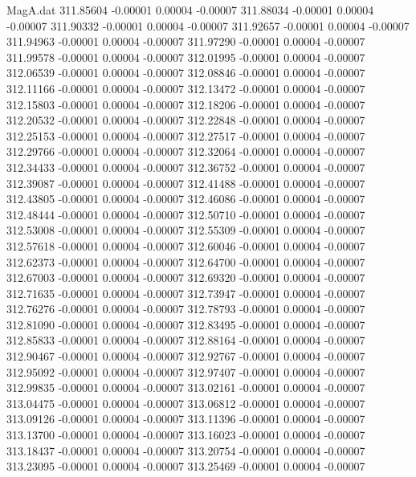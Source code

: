 \begin{filecontents}{MagA.dat}
 311.85604   -0.00001    0.00004   -0.00007
 311.88034   -0.00001    0.00004   -0.00007
 311.90332   -0.00001    0.00004   -0.00007
 311.92657   -0.00001    0.00004   -0.00007
 311.94963   -0.00001    0.00004   -0.00007
 311.97290   -0.00001    0.00004   -0.00007
 311.99578   -0.00001    0.00004   -0.00007
 312.01995   -0.00001    0.00004   -0.00007
 312.06539   -0.00001    0.00004   -0.00007
 312.08846   -0.00001    0.00004   -0.00007
 312.11166   -0.00001    0.00004   -0.00007
 312.13472   -0.00001    0.00004   -0.00007
 312.15803   -0.00001    0.00004   -0.00007
 312.18206   -0.00001    0.00004   -0.00007
 312.20532   -0.00001    0.00004   -0.00007
 312.22848   -0.00001    0.00004   -0.00007
 312.25153   -0.00001    0.00004   -0.00007
 312.27517   -0.00001    0.00004   -0.00007
 312.29766   -0.00001    0.00004   -0.00007
 312.32064   -0.00001    0.00004   -0.00007
 312.34433   -0.00001    0.00004   -0.00007
 312.36752   -0.00001    0.00004   -0.00007
 312.39087   -0.00001    0.00004   -0.00007
 312.41488   -0.00001    0.00004   -0.00007
 312.43805   -0.00001    0.00004   -0.00007
 312.46086   -0.00001    0.00004   -0.00007
 312.48444   -0.00001    0.00004   -0.00007
 312.50710   -0.00001    0.00004   -0.00007
 312.53008   -0.00001    0.00004   -0.00007
 312.55309   -0.00001    0.00004   -0.00007
 312.57618   -0.00001    0.00004   -0.00007
 312.60046   -0.00001    0.00004   -0.00007
 312.62373   -0.00001    0.00004   -0.00007
 312.64700   -0.00001    0.00004   -0.00007
 312.67003   -0.00001    0.00004   -0.00007
 312.69320   -0.00001    0.00004   -0.00007
 312.71635   -0.00001    0.00004   -0.00007
 312.73947   -0.00001    0.00004   -0.00007
 312.76276   -0.00001    0.00004   -0.00007
 312.78793   -0.00001    0.00004   -0.00007
 312.81090   -0.00001    0.00004   -0.00007
 312.83495   -0.00001    0.00004   -0.00007
 312.85833   -0.00001    0.00004   -0.00007
 312.88164   -0.00001    0.00004   -0.00007
 312.90467   -0.00001    0.00004   -0.00007
 312.92767   -0.00001    0.00004   -0.00007
 312.95092   -0.00001    0.00004   -0.00007
 312.97407   -0.00001    0.00004   -0.00007
 312.99835   -0.00001    0.00004   -0.00007
 313.02161   -0.00001    0.00004   -0.00007
 313.04475   -0.00001    0.00004   -0.00007
 313.06812   -0.00001    0.00004   -0.00007
 313.09126   -0.00001    0.00004   -0.00007
 313.11396   -0.00001    0.00004   -0.00007
 313.13700   -0.00001    0.00004   -0.00007
 313.16023   -0.00001    0.00004   -0.00007
 313.18437   -0.00001    0.00004   -0.00007
 313.20754   -0.00001    0.00004   -0.00007
 313.23095   -0.00001    0.00004   -0.00007
 313.25469   -0.00001    0.00004   -0.00007

\end{filecontents}

